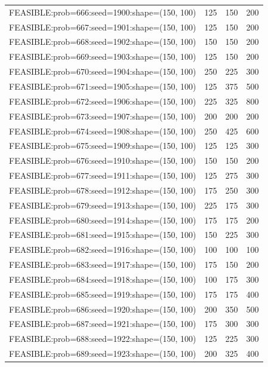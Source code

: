 \begin{longtable}{lccc}
FEASIBLE:prob=666:seed=1900:shape=(150, 100) &  125 &   150 &    200 \\
FEASIBLE:prob=667:seed=1901:shape=(150, 100) &  125 &   150 &    200 \\
FEASIBLE:prob=668:seed=1902:shape=(150, 100) &  150 &   150 &    200 \\
FEASIBLE:prob=669:seed=1903:shape=(150, 100) &  125 &   150 &    200 \\
FEASIBLE:prob=670:seed=1904:shape=(150, 100) &  250 &   225 &    300 \\
FEASIBLE:prob=671:seed=1905:shape=(150, 100) &  125 &   375 &    500 \\
FEASIBLE:prob=672:seed=1906:shape=(150, 100) &  225 &   325 &    800 \\
FEASIBLE:prob=673:seed=1907:shape=(150, 100) &  200 &   200 &    200 \\
FEASIBLE:prob=674:seed=1908:shape=(150, 100) &  250 &   425 &    600 \\
FEASIBLE:prob=675:seed=1909:shape=(150, 100) &  125 &   125 &    300 \\
FEASIBLE:prob=676:seed=1910:shape=(150, 100) &  150 &   150 &    200 \\
FEASIBLE:prob=677:seed=1911:shape=(150, 100) &  125 &   275 &    300 \\
FEASIBLE:prob=678:seed=1912:shape=(150, 100) &  175 &   250 &    300 \\
FEASIBLE:prob=679:seed=1913:shape=(150, 100) &  225 &   175 &    300 \\
FEASIBLE:prob=680:seed=1914:shape=(150, 100) &  175 &   175 &    200 \\
FEASIBLE:prob=681:seed=1915:shape=(150, 100) &  150 &   225 &    300 \\
FEASIBLE:prob=682:seed=1916:shape=(150, 100) &  100 &   100 &    100 \\
FEASIBLE:prob=683:seed=1917:shape=(150, 100) &  175 &   150 &    200 \\
FEASIBLE:prob=684:seed=1918:shape=(150, 100) &  100 &   175 &    300 \\
FEASIBLE:prob=685:seed=1919:shape=(150, 100) &  175 &   175 &    400 \\
FEASIBLE:prob=686:seed=1920:shape=(150, 100) &  200 &   350 &    500 \\
FEASIBLE:prob=687:seed=1921:shape=(150, 100) &  175 &   300 &    300 \\
FEASIBLE:prob=688:seed=1922:shape=(150, 100) &  125 &   225 &    300 \\
FEASIBLE:prob=689:seed=1923:shape=(150, 100) &  200 &   325 &    400 \\

\end{longtable}
